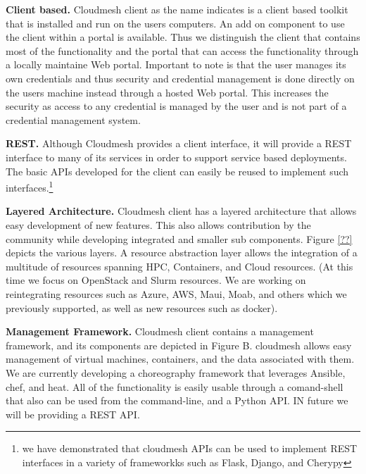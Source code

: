 \documentclass[9pt,twocolumn,twoside]{../../styles/osajnl}
\begin{document}
\begin{description}

\item{\bf Client based.} Cloudmesh client as the name indicates is a
  client based toolkit that is installed and run on the users
  computers. An add on component to use the client within a portal is
  available. Thus we distinguish the client that contains most of the
  functionality and the portal that can access the functionality
  through a locally maintaine Web portal. Important to note is that
  the user manages its own credentials and thus security and
  credential management is done directly on the users machine instead
  through a hosted Web portal. This increases the security as access
  to any credential is managed by the user and is not part of a
  credential management system.

\item{\bf REST.} Although Cloudmesh provides a client interface, it
will provide a REST interface to many of its services in order to
support service based deployments. The basic APIs developed for the
client can easily be reused to implement such interfaces.\footnote{we
  have demonstrated that cloudmesh APIs can be used to implement REST
  interfaces in a variety of frameworkks such as Flask, Django, and Cherypy}

\item{\bf Layered Architecture.} Cloudmesh client has a layered
architecture that allows easy development of new features. This also
allows contribution by the community while developing integrated and
smaller sub components. Figure \ref{??} depicts the various layers. A
resource abstraction layer allows the integration of a multitude of
resources spanning HPC, Containers, and Cloud resources. (At this time
we focus on OpenStack and Slurm resources. We are working on
reintegrating resources such as Azure, AWS, Maui, Moab, and others
which we previously supported, as well as new resources such as
docker).

\item{\bf Management Framework.} Cloudmesh client contains a
management framework, and its components are depicted in Figure
B. cloudmesh allows easy management of virtual machines, containers,
and the data associated with them. We are currently developing a
choreography framework that leverages Ansible, chef, and heat. All of
the functionality is easily usable through a comand-shell that also
can be used from the command-line, and a Python API. IN future we will
be providing a REST API.


\end{description}
\end{document}
